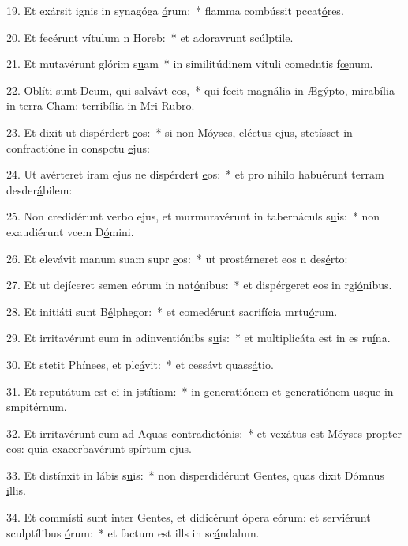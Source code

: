 19. Et exársit ignis in synagóga \uline{ó}rum:~* flamma combússit pccat\uline{ó}res.\par 
20. Et fecérunt vítulum n H\uline{o}reb:~* et adoravrunt sc\uline{ú}lptile.\par 
21. Et mutavérunt glórim s\uline{u}am~* in similitúdinem vítuli comedntis f\uline{œ}num.\par 
22. Oblíti sunt Deum, qui salvávt \uline{e}os,~* qui fecit magnália in Ægýpto, mirabília in terra Cham: terribília in Mri R\uline{u}bro.\par 
23. Et dixit ut dispérdert \uline{e}os:~* si non Móyses, eléctus ejus, stetísset in confractióne in conspctu \uline{e}jus:\par 
24. Ut avérteret iram ejus ne dispérdert \uline{e}os:~* et pro níhilo habuérunt terram desder\uline{á}bilem:\par 
25. Non credidérunt verbo ejus, et murmuravérunt in tabernáculs s\uline{u}is:~* non exaudiérunt vcem D\uline{ó}mini.\par 
26. Et elevávit manum suam supr \uline{e}os:~* ut prostérneret eos n des\uline{é}rto:\par 
27. Et ut dejíceret semen eórum in nat\uline{ó}nibus:~* et dispérgeret eos in rgi\uline{ó}nibus.\par 
28. Et initiáti sunt B\uline{é}lphegor:~* et comedérunt sacrifícia mrtu\uline{ó}rum.\par 
29. Et irritavérunt eum in adinventiónibs s\uline{u}is:~* et multiplicáta est in es ru\uline{í}na.\par 
30. Et stetit Phínees, et plc\uline{á}vit:~* et cessávt quass\uline{á}tio.\par 
31. Et reputátum est ei in jst\uline{í}tiam:~* in generatiónem et generatiónem usque in smpit\uline{é}rnum.\par 
32. Et irritavérunt eum ad Aquas contradict\uline{ó}nis:~* et vexátus est Móyses propter eos: quia exacerbavérunt spírtum \uline{e}jus.\par 
33. Et distínxit in lábis s\uline{u}is:~* non disperdidérunt Gentes, quas dixit Dómnus \uline{i}llis.\par 
34. Et commísti sunt inter Gentes, et didicérunt ópera eórum: et serviérunt sculptílibus \uline{ó}rum:~* et factum est ills in sc\uline{á}ndalum.\par 
